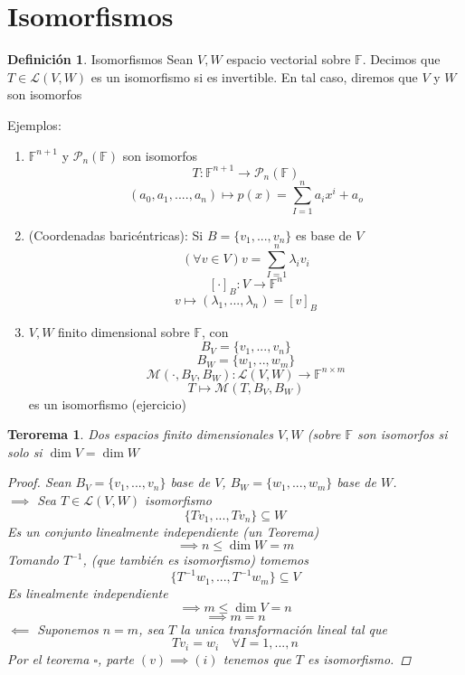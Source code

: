 \documentclass[11pt]{book}
\newtheorem{thm}{Terorema}[section]
\theoremstyle{definition}
\newtheorem{defn}{Definición}[section]
\begin{document}
\section{Isomorfismos}
\begin{defn}{Isomorfismos}
Sean $V,W$ espacio vectorial sobre $\mathbb{F}$. Decimos que $T\in\mathcal{L}(V,W)$ es un isomorfismo si es invertible. En tal caso, diremos que $V$ y $W$ son isomorfos
\end{defn}
Ejemplos:
\begin{enumerate}
	\item $\mathbb{F}^{n+1}$ y $\mathcal{P}_n(\mathbb{F})$ son isomorfos\\
	\[T:\mathbb{F}^{n+1}\rightarrow \mathcal{P}_n(\mathbb{F})\]
	\[(a_0,a_1,....,a_n)\mapsto p(x)=\sum^n_{I=1}a_ix^i+a_o\]
	
	\item (Coordenadas baricéntricas): Si $B=\{v_1,...,v_n\}$ es base de $V$\\
	\[(\forall v\in V)v=\sum^n_{I=1}\lambda_i v_i\]
	\[ [\cdot ]_B:V\rightarrow \mathbb{F}^n\]
	\[ v\mapsto(\lambda_1,...,\lambda_n)=[v]_B\]
	
	\item $V,W$ finito dimensional sobre $\mathbb{F}$, con
	\[B_V=\{v_1,...,v_n\}\]
	\[B_W=\{w_1,..,w_m\}\]
	\[\mathcal{M}(\cdot,B_V,B_W):\mathcal{L}(V,W)\rightarrow \mathbb{F}^{n\times m}\]
	\[T\mapsto\mathcal{M}(T,B_V,B_W)\]
	es un isomorfismo (ejercicio)
\end{enumerate}
\begin{thm}
Dos espacios finito dimensionales $V,W$ (sobre $\mathbb{F}$ son isomorfos si solo si $\dim V= \dim W$
\begin{proof}
Sean $B_V=\{v_1,...,v_n\}$ base de $V$, $B_W=\{w_1,...,w_m\}$ base de $W$.\\
$\implies$ Sea $T\in\mathcal{L}(V,W)$ isomorfismo
\[\{Tv_1,...,Tv_n\}\subseteq W\]
Es un conjunto linealmente independiente (un Teorema)
\[\implies n\leq \dim W=m\]
Tomando $T^{-1}$, (que también es isomorfismo) tomemos
\[\{T^{-1}w_1,...,T^{-1}w_m\}\subseteq V\]
Es linealmente independiente
\[\implies m\leq\dim V=n\]
\[\implies m=n\]
$\impliedby$ Suponemos $n=m$, sea $T$ la unica transformación lineal tal que
\[Tv_i=w_i\quad\forall I=1,...,n\]
Por el teorema $\square$, parte $(v)\implies (i)$ tenemos que $T$ es isomorfismo.
\end{proof}
\end{thm}
\end{document}
